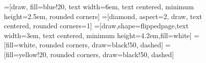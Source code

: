 \begin{figure}[h!]


  \makeatletter

  =[draw, fill=blue!20, text width=6em, text centered, minimum height=2.5em, rounded corners]
  =[diamond, aspect=2, draw, text centered, rounded corners=1]
  =[draw,shape=flippedpage,text width=3em, text centered,
  minimum height=4.2em,fill=white]
  =[fill=white, rounded corners, draw=black!50, dashed]
  =[fill=yellow!20, rounded corners, draw=black!50, dashed]

  \begin{center}
\end{center}
\end{figure}

